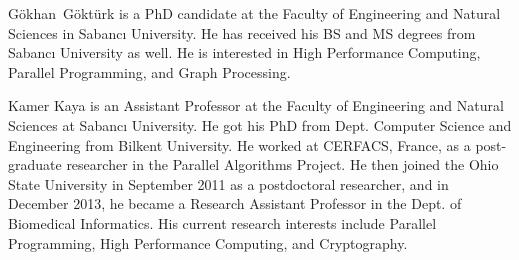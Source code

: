 \documentclass[10pt,journal,compsoc]{IEEEtran}
\begin{document}


\begin{IEEEbiography}{G\"{o}khan~G\"{o}kt\"{u}rk} is a PhD candidate at the Faculty of Engineering and Natural Sciences in Sabancı University. He has received his BS and MS degrees from Sabancı University as well. He is interested in High Performance Computing, Parallel Programming, and Graph Processing.
\end{IEEEbiography}
\begin{IEEEbiography}{Kamer Kaya} is an Assistant Professor at the Faculty of Engineering and Natural Sciences at Sabancı University. He got his PhD from Dept. Computer Science and Engineering from Bilkent University. He worked at CERFACS, France, as a post-graduate researcher in the Parallel Algorithms Project. He then joined the Ohio State University in September 2011 as a postdoctoral researcher, and in December 2013, he became a Research Assistant Professor in the Dept. of Biomedical Informatics.
His current research interests include Parallel Programming, High Performance Computing, and Cryptography. 
    \end{IEEEbiography}
\end{document}
